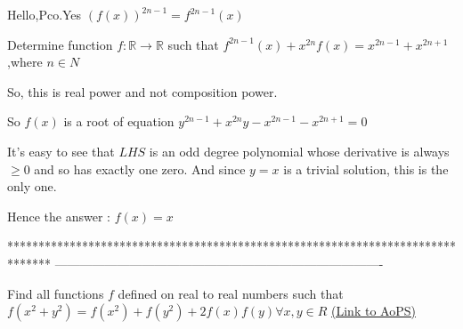 \begin{solution}
	Hello,Pco.Yes $(f(x))^{2n-1}=f^{2n-1}(x)$
\end{solution}



\begin{solution}
	\begin{tcolorbox}Determine function $f: \mathbb{R}\to\mathbb{R}$ such that $f^{2n-1}(x)+x^{2n}f(x)=x^{2n-1}+x^{2n+1}$,where $n\in{N}$\end{tcolorbox}
So, this is real power and not composition power.

So $f(x)$ is a root of equation $y^{2n-1}+x^{2n}y-x^{2n-1}-x^{2n+1}=0$

It's easy to see that $LHS$ is an odd degree polynomial whose derivative is always $\ge 0$ and so has exactly one zero. And since $y=x$ is a trivial solution, this is the only one.

Hence the answer : $\boxed{f(x)=x}$
\end{solution}
*******************************************************************************
-------------------------------------------------------------------------------

\begin{problem}
	Find all functions $f$ defined on real to real numbers  such that
$f(x^2+y^2)=f(x^2)+f(y^2)+2f(x)f(y) \forall x, y \in  R$
	\flushright \href{https://artofproblemsolving.com/community/c6h477552}{(Link to AoPS)}
\end{problem}



